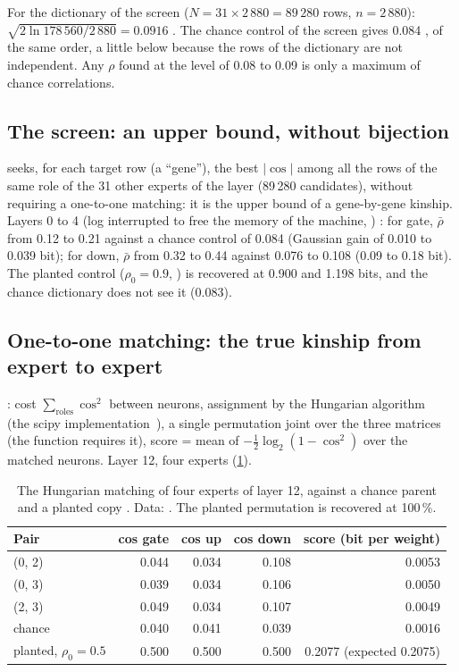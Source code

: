 For the dictionary of the screen ($N = 31 \times 2\,880 = 89\,280$ rows, $n = 2\,880$): $\sqrt{2\ln 178\,560 / 2\,880} = 0.0916$ \calc. The chance control of the screen gives 0.084 \mes, of the same order, a little below because the rows of the dictionary are not independent. Any $\rho$ found at the level of 0.08 to 0.09 is only a maximum of chance correlations.

\subsection{The screen: an upper bound, without bijection}

 seeks, for each target row (a ``gene''), the best $|\cos|$ among all the rows of the same role of the 31 other experts of the layer (89\,280 candidates), without requiring a one-to-one matching: it is the upper bound of a gene-by-gene kinship. Layers 0 to 4 (log interrupted to free the memory of the machine, ) \mes: for gate, $\bar\rho$ from 0.12 to 0.21 against a chance control of 0.084 (Gaussian gain of 0.010 to 0.039 bit); for down, $\bar\rho$ from 0.32 to 0.44 against 0.076 to 0.108 (0.09 to 0.18 bit). The planted control ($\rho_0 = 0.9$, ) is recovered at 0.900 and 1.198 bits, and the chance dictionary does not see it (0.083).

\subsection{One-to-one matching: the true kinship from expert to expert}

: cost $\sum_{\text{roles}} \cos^2$ between neurons, assignment by the Hungarian algorithm~\cite{kuhn1955hungarian} (the scipy implementation~\cite{crouse2016assignment}), a single permutation joint over the three matrices (the function requires it), score = mean of $-\frac12\log_2(1 - \cos^2)$ over the matched neurons. Layer 12, four experts (\cref{t3dup:tab:paires}).

\begin{table}[tbp]
\centering\small
\begin{tabular}{l r r r r}
\toprule
Pair & cos gate & cos up & cos down & score (bit per weight) \\
\midrule
(0, 2) & 0.044 & 0.034 & 0.108 & 0.0053 \\
(0, 3) & 0.039 & 0.034 & 0.106 & 0.0050 \\
(2, 3) & 0.049 & 0.034 & 0.107 & 0.0049 \\
chance & 0.040 & 0.041 & 0.039 & 0.0016 \\
planted, $\rho_0 = 0.5$ & 0.500 & 0.500 & 0.500 & 0.2077 (expected 0.2075) \\
\bottomrule
\end{tabular}
\caption[The Hungarian matching, layer 12]{The Hungarian matching of four experts of layer 12, against a chance parent and a planted copy \mes. Data: . The planted permutation is recovered at 100\,\%.}
\label{t3dup:tab:paires}
\end{table}

